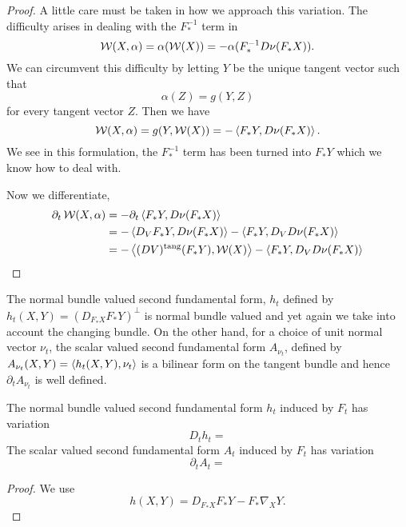 \begin{proof}
A little care must be taken in how we approach this variation. The difficulty arises in dealing with the \(F_{\ast}^{-1}\) term in
\[
\operatorname{\mathcal{W}}(X, \alpha) = \alpha(\operatorname{\mathcal{W}}(X)) = -\alpha(F_{\ast}^{-1} D\nu(F_{\ast} X)).
\]
We can circumvent this difficulty by letting \(Y\) be the unique tangent vector such that
\[
\alpha(Z) = g(Y, Z)
\]
for every tangent vector \(Z\). Then we have
\[
\operatorname{\mathcal{W}}(X, \alpha) = g(Y, \operatorname{\mathcal{W}}(X)) = -\left\langle F_{\ast} Y,D\nu(F_{\ast} X) \right\rangle.
\]
We see in this formulation, the \(F_{\ast}^{-1}\) term has been turned into \(F_{\ast} Y\) which we know how to deal with.

Now we differentiate,
\[
\begin{split}
\partial_t \operatorname{\mathcal{W}}(X, \alpha) &= -\partial_t \left\langle F_{\ast} Y,D\nu(F_{\ast} X) \right\rangle \\
&= -\left\langle D_V F_{\ast} Y,D\nu(F_{\ast} X) \right\rangle - \left\langle F_{\ast} Y,D_V D\nu(F_{\ast} X) \right\rangle \\
&= -\left\langle (DV)^{\operatorname{tang}} (F_{\ast} Y),\operatorname{\mathcal{W}}(X) \right\rangle - \left\langle F_{\ast} Y,D_V D\nu(F_{\ast} X) \right\rangle
\end{split}
\]
\end{proof}

The normal bundle valued second fundamental form, \(h_t\) defined by \(h_t(X, Y) = (D_{F_{\ast} X} F_{\ast} Y)^{\perp}\) is normal bundle valued and yet again we take into account the changing bundle. On the other hand, for a choice of unit normal vector \(\nu_t\), the scalar valued second fundamental form \(A_{\nu_t}\), defined by \(A_{\nu_t} (X, Y) = \left\langle h_t(X, Y),\nu_t \right\rangle\) is a bilinear form on the tangent bundle and hence \(\partial_t A_{\nu_t}\) is well defined.

\begin{lemma}
The normal bundle valued second fundamental form \(h_t\) induced by \(F_t\) has variation
\[
D_t h_t =
\]
The scalar valued second fundamental form \(A_t\) induced by \(F_t\) has variation
\[
\partial_t A_t =
\]
\end{lemma}

\begin{proof}
We use
\[
h(X, Y) = D_{F_{\ast} X} F_{\ast} Y - F_{\ast} \nabla_X Y.
\]
\end{proof}
